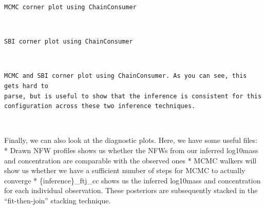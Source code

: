 \documentclass[11pt]{article}
\begin{document}
    \begin{Verbatim}[commandchars=\\\{\}]
MCMC corner plot using ChainConsumer
    \end{Verbatim}

    \begin{center}
    \end{center}
    { \hspace*{\fill} \\}
    
    \begin{Verbatim}[commandchars=\\\{\}]
SBI corner plot using ChainConsumer
    \end{Verbatim}

    \begin{center}
    \end{center}
    { \hspace*{\fill} \\}
    
    \begin{Verbatim}[commandchars=\\\{\}]
MCMC and SBI corner plot using ChainConsumer. As you can see, this gets hard to
parse, but is useful to show that the inference is consistent for this
configuration across these two inference techniques.
    \end{Verbatim}

    \begin{center}
    \end{center}
    { \hspace*{\fill} \\}
    
    Finally, we can also look at the diagnostic plots. Here, we have some
useful files: * Drawn NFW profiles shows us whether the NFWs from our
inferred log10mass and concentration are comparable with the observed
ones * MCMC walkers will show us whether we have a sufficient number of
steps for MCMC to actually converge * \{inference\}\_ftj\_cc shows us
the inferred log10mass and concentration for each individual
observation. These posteriors are subsequently stacked in the
``fit-then-join'' stacking technique.
\end{document}
